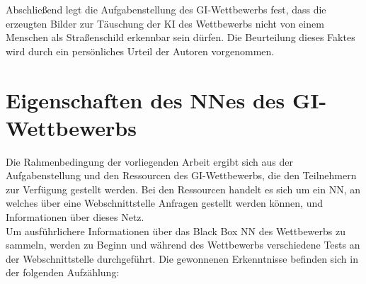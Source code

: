 Abschließend legt die Aufgabenstellung des \ac{GI}-Wettbewerbs fest, dass die erzeugten Bilder zur Täuschung der \ac{KI} des Wettbewerbs nicht von einem Menschen als Straßenschild erkennbar sein dürfen. Die Beurteilung dieses Faktes wird durch ein persönliches Urteil der Autoren vorgenommen.

\section{Eigenschaften des \acl{NN}es des \ac{GI}-Wettbewerbs}
\label{sec:EigenschaftenTrasi}
Die Rahmenbedingung der vorliegenden Arbeit ergibt sich aus der Aufgabenstellung und den Ressourcen des \ac{GI}-Wettbewerbs, die den Teilnehmern zur Verfügung gestellt werden. Bei den Ressourcen handelt es sich um ein \ac{NN}, an welches über eine Webschnittstelle Anfragen gestellt werden können, und Informationen über dieses Netz.\\
Um ausführlichere Informationen über das Black Box \ac{NN} des Wettbewerbs zu sammeln, werden zu Beginn und während des Wettbewerbs verschiedene Tests an der Webschnittstelle durchgeführt. Die gewonnenen Erkenntnisse befinden sich in der folgenden Aufzählung:

